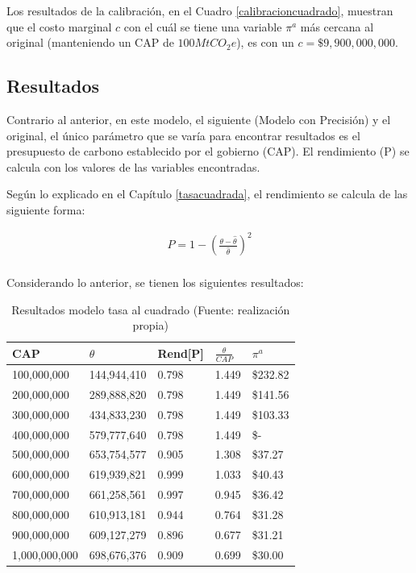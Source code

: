 Los resultados de la calibración, en el Cuadro \ref{calibracioncuadrado}, muestran que el costo marginal $c$ con el cuál se tiene una variable $\pi^a$ más cercana al original (manteniendo un CAP de $100MtCO_{2}e$), es con un $c=\$9,900,000,000$.

\subsection{Resultados}

Contrario al anterior, en este modelo, el siguiente (Modelo con Precisión) y el original, el único parámetro que se varía para encontrar resultados es el presupuesto de carbono establecido por el gobierno (CAP). El rendimiento (P) se calcula con los valores de las variables encontradas.
\vspace{2.5mm}

Según lo explicado en el Capítulo \ref{tasacuadrada}, el rendimiento se calcula de las siguiente forma: 
\vspace{2.5mm}

\begin{equation}
\begin{array}{rrclcl}
\displaystyle P = 1- (\frac{{\theta - \hat{\theta}}}{\hat{\theta}})^2 \\
\end{array}
\end{equation}

Considerando lo anterior, se tienen los siguientes resultados:

\begin{table}[H]
    \centering
    \begin{tabular}{|l|l|l|l|l|}
    \hline
        CAP & $\theta$ & Rend[P] & $\frac{\theta}{CAP}$  & $\pi^a$  \\ \hline
        100,000,000 & 144,944,410  & 0.798  & 1.449  &  \$232.82   \\ \hline
        200,000,000 & 289,888,820  & 0.798  & 1.449  &  \$141.56   \\ \hline
        300,000,000 & 434,833,230  & 0.798  & 1.449  &  \$103.33   \\ \hline
        400,000,000 & 579,777,640  & 0.798  & 1.449  &  \$-   \\ \hline
        500,000,000 & 653,754,577  & 0.905  & 1.308  &  \$37.27   \\ \hline
        600,000,000 & 619,939,821  & 0.999  & 1.033  &  \$40.43   \\ \hline
        700,000,000 & 661,258,561  & 0.997  & 0.945  &  \$36.42   \\ \hline
        800,000,000 & 610,913,181  & 0.944  & 0.764  &  \$31.28   \\ \hline
        900,000,000 & 609,127,279  & 0.896  & 0.677  &  \$31.21   \\ \hline
        1,000,000,000 & 698,676,376  & 0.909  & 0.699  &  \$30.00   \\ \hline
    \end{tabular}
    \caption{{\footnotesize Resultados modelo tasa al cuadrado (Fuente: realización propia)}}
    \label{resultadostasacuadrada}
\end{table}


